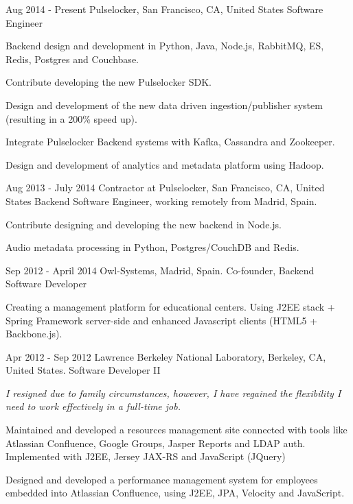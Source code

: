 
\experience
  {Aug 2014 - Present}
  {Pulselocker, San Francisco, CA, United States}
  {Software Engineer}
  {\vspace{-1em}\begin{rlist}
    \item Backend design and development in Python, Java, Node.js, RabbitMQ, ES, Redis, Postgres and Couchbase.
    \item Contribute developing the new Pulselocker SDK.
    \item Design and development of the new data driven ingestion/publisher system (resulting in a 200\% speed up).
    \item Integrate Pulselocker Backend systems with Kafka, Cassandra and Zookeeper.
    \item Design and development of analytics and metadata platform using Hadoop.
  \end{rlist}}

\experience
  {Aug 2013 - July 2014}
  {Contractor at Pulselocker, San Francisco, CA, United States}
  {Backend Software Engineer, working remotely from Madrid, Spain.}
  {\vspace{-1em}\begin{rlist}
    \item Contribute designing and developing the new backend in Node.js.
    \item Audio metadata processing in Python, Postgres/CouchDB and Redis.
  \end{rlist}}

\experience
  {Sep 2012 - April 2014}
  {Owl-Systems, Madrid, Spain.}
  {Co-founder, Backend Software Developer}
  {\vspace{-1em}\begin{rlist}
    \item Creating a management platform for educational centers. Using J2EE stack +
    Spring Framework server-side and enhanced Javascript clients (HTML5 +
    Backbone.js).
  \end{rlist}}

\experience
  {Apr 2012 - Sep 2012}
  {Lawrence Berkeley National Laboratory, Berkeley, CA, United States.}
  {Software Developer II}
  {\emph{I resigned due to family circumstances, however, I have
    regained the flexibility I need to work effectively in a full-time
    job.}
    \begin{rlist}
    \item Maintained and developed a resources management site
    connected with tools like Atlassian Confluence, Google Groups, Jasper
    Reports and LDAP auth. Implemented with J2EE, Jersey JAX-RS and
    JavaScript (JQuery)
    \item Designed and developed a performance management system for
    employees embedded into Atlassian Confluence, using J2EE, JPA,
    Velocity and JavaScript.
  \end{rlist}}


